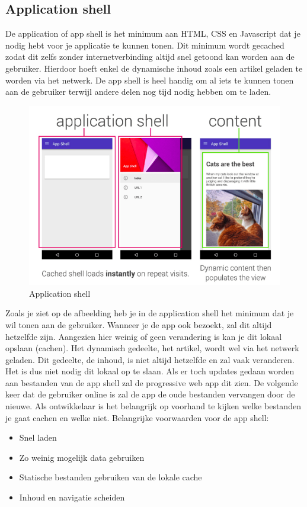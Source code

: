 \subsection{Application shell}
De application of app shell is het minimum aan HTML, CSS en Javascript dat je nodig hebt voor je applicatie te kunnen tonen. Dit minimum wordt gecached zodat dit zelfs zonder internetverbinding altijd snel getoond kan worden aan de gebruiker. Hierdoor hoeft enkel de dynamische inhoud zoals een artikel geladen te worden via het netwerk.
De app shell is heel handig om al iets te kunnen tonen aan de gebruiker terwijl andere delen nog tijd nodig hebben om te laden.
\begin{figure}[h]
	\includegraphics[scale=0.5]{img/appShell.png}
	\caption{Application shell}
	\label{fig:appShell}
\end{figure}
Zoals je ziet op de afbeelding heb je in de application shell het minimum dat je wil tonen aan de gebruiker. Wanneer je de app ook bezoekt, zal dit altijd hetzelfde zijn. Aangezien hier weinig of geen verandering is kan je dit lokaal opslaan (cachen). Het dynamisch gedeelte, het artikel, wordt wel via het netwerk geladen. Dit gedeelte, de inhoud, is niet altijd hetzelfde en zal vaak veranderen. Het is dus niet nodig dit lokaal op te slaan. Als er toch updates gedaan worden aan bestanden van de app shell zal de progressive web app dit zien. De volgende keer dat de gebruiker online is zal de app de oude bestanden vervangen door de nieuwe. Als ontwikkelaar is het belangrijk op voorhand te kijken welke bestanden je gaat cachen en welke niet.
Belangrijke voorwaarden voor de app shell: 
\begin{itemize}  
	\item Snel laden
	\item Zo weinig mogelijk data gebruiken
	\item Statische bestanden gebruiken van de lokale cache
	\item Inhoud en navigatie scheiden
\end{itemize}

